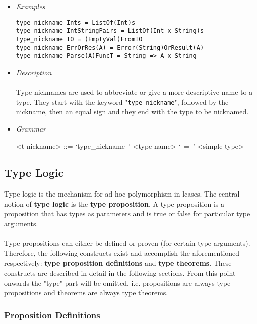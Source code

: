 \documentclass{article}
\begin{document}
\begin{itemize}

\item \textit{Examples}

\begin{verbatim}
type_nickname Ints = ListOf(Int)s
type_nickname IntStringPairs = ListOf(Int x String)s
type_nickname IO = (EmptyVal)FromIO
type_nickname ErrOrRes(A) = Error(String)OrResult(A)
type_nickname Parse(A)FuncT = String => A x String
\end{verbatim}

\item \textit{Description} \\\\
Type nicknames are used to abbreviate or give a more descriptive name to a type.
They start with the keyword "\texttt{type_nickname}", followed by the nickname, 
then an equal sign and they end with the type to be nicknamed.

\item \textit{Grammar}

\begin{grammar}
<t-nickname> ::= `type_nickname\ ' <type-name> `\ =\ ' <simple-type>
\end{grammar} 

\end{itemize}

\subsection{Type Logic}
\label{subsec:typelogic}

Type logic is the mechanism for ad hoc polymorphism in lcases. The central
notion of \textbf{type logic} is the \textbf{type proposition}. A type
proposition is a proposition that has types as parameters and is true or false
for particular type arguments.
\\\\
Type propositions can either be defined or proven (for certain type arguments).
Therefore, the following constructs exist and accomplish the aforementioned
respectively: \textbf{type proposition definitions} and \textbf{type theorems}.
These constructs are described in detail in the following sections. From this
point onwards the "type" part will be omitted, i.e. propositions are always
type propositions and theorems are always type theorems. 

\subsubsection{Proposition Definitions}
\end{document}
